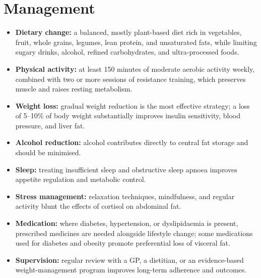 \section*{Management}
\begin{itemize}
    \item \textbf{Dietary change:} a balanced, mostly plant-based diet rich in vegetables, fruit, whole grains, legumes, lean protein, and unsaturated fats, while limiting sugary drinks, alcohol, refined carbohydrates, and ultra-processed foods.
    \item \textbf{Physical activity:} at least 150 minutes of moderate aerobic activity weekly, combined with two or more sessions of resistance training, which preserves muscle and raises resting metabolism.
    \item \textbf{Weight loss:} gradual weight reduction is the most effective strategy; a loss of 5--10\% of body weight substantially improves insulin sensitivity, blood pressure, and liver fat.
    \item \textbf{Alcohol reduction:} alcohol contributes directly to central fat storage and should be minimised.
    \item \textbf{Sleep:} treating insufficient sleep and obstructive sleep apnoea improves appetite regulation and metabolic control.
    \item \textbf{Stress management:} relaxation techniques, mindfulness, and regular activity blunt the effects of cortisol on abdominal fat.
    \item \textbf{Medication:} where diabetes, hypertension, or dyslipidaemia is present, prescribed medicines are needed alongside lifestyle change; some medications used for diabetes and obesity promote preferential loss of visceral fat.
    \item \textbf{Supervision:} regular review with a GP, a dietitian, or an evidence-based weight-management program improves long-term adherence and outcomes.
\end{itemize}

